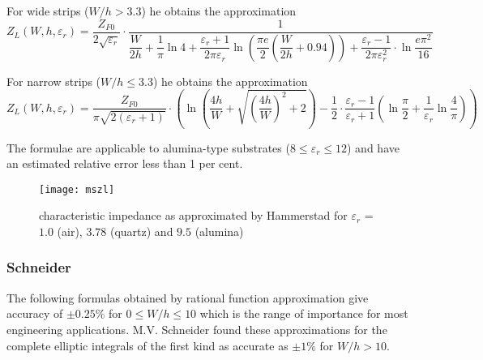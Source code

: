 \addvspace{12pt}

For wide strips ($W/h > 3.3$) he obtains the approximation
\begin{equation}
Z_{L}\left(W, h, \varepsilon_{r}\right) =
\frac{Z_{F0}}{2\sqrt{\varepsilon_{r}}}\cdot\frac{1}{\dfrac{W}{2h} + \dfrac{1}{\pi}\ln{4} + \dfrac{\varepsilon_{r} + 1}{2\pi \varepsilon_{r}} \ln{\left(\dfrac{\pi e}{2}\left(\dfrac{W}{2h} + 0.94\right)\right)} + \dfrac{\varepsilon_{r} - 1}{2\pi \varepsilon_{r}^{2}}\cdot \ln{\dfrac{e\pi^{2}}{16}}}
\end{equation}

For narrow strips ($W/h \le 3.3$) he obtains the approximation
\begin{equation}
Z_{L}\left(W, h, \varepsilon_{r}\right) =
\frac{Z_{F0}}{\pi \sqrt{2 \left(\varepsilon_{r} + 1\right)}} \cdot \left(\ln{\left(\frac{4h}{W} + \sqrt{\left(\frac{4h}{W}\right)^{2} + 2}\right)} - \frac{1}{2}\cdot \frac{\varepsilon_{r} - 1}{\varepsilon_{r} + 1}\left(\ln{\frac{\pi}{2}} + \frac{1}{\varepsilon_{r}} \ln{\frac{4}{\pi}}\right)\right)
\end{equation}

The formulae are applicable to alumina-type substrates ($8 \le
\varepsilon_r \le 12$) and have an estimated relative error less than
1 per cent.

\begin{figure}[ht]
\begin{center}
\texttt{[image: mszl]}
\end{center}
\caption{characteristic impedance as approximated by Hammerstad for $\varepsilon_{r}$ = $1.0$ (air), $3.78$ (quartz) and $9.5$ (alumina)}
\label{fig:mszl}
\end{figure}
\FloatBarrier

\subsubsection{Schneider}

The following formulas obtained by rational function approximation
give accuracy of $\pm 0.25\%$ for $0 \le W/h \le 10$ which is the
range of importance for most engineering applications.  M.V. Schneider
\cite{Schneider} found these approximations for the complete elliptic
integrals of the first kind as accurate as $\pm 1\%$ for $W/h > 10$.

